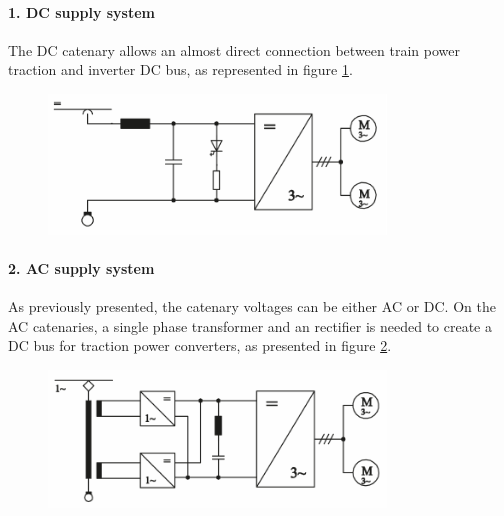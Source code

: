 \paragraph{1. DC supply system\\}


The DC catenary allows an almost direct connection between train power traction and inverter DC bus, as represented in figure \ref{fig:steimel2008a}.


\begin{figure}[h!]
	\centering
	\begin{minipage}{.6\textwidth}
		\centering
		\includegraphics[width=0.8\textwidth,keepaspectratio]{figures/31.PowerS/steimel2008a}
		\label{fig:steimel2008a}
	\end{minipage}
\end{figure}


\paragraph{2. AC supply system\\}

As previously presented, the catenary voltages can be either AC or DC. On the AC catenaries, a single phase transformer and an rectifier is needed to create a DC bus for traction power converters, as presented in figure \ref{fig:steimel2008b}.

\begin{figure}[h!]
	\centering
	\begin{minipage}{.6\textwidth}
		\centering
		\includegraphics[width=0.8\textwidth,keepaspectratio]{figures/31.PowerS/steimel2008b}
		\label{fig:steimel2008b}
	\end{minipage}
\end{figure}




